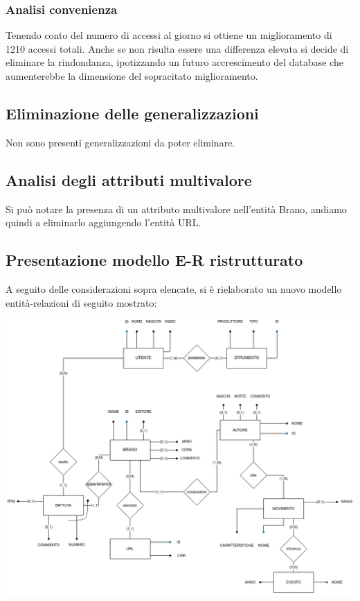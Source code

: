 \documentclass{article}
\begin{document}
    \subsubsection{Analisi convenienza}

    Tenendo conto del numero di accessi al giorno si ottiene un miglioramento di 1210 accessi totali. Anche se non risulta essere una differenza elevata si decide di eliminare la rindondanza, ipotizzando un futuro accrescimento del database che
    aumenterebbe la dimensione del sopracitato miglioramento.\\

    \subsection{Eliminazione delle generalizzazioni}

    Non sono presenti generalizzazioni da poter eliminare.\\

    \subsection{Analisi degli attributi multivalore}

    Si può notare la presenza di un attributo multivalore nell'entità Brano, andiamo quindi a eliminarlo aggiungendo l'entità URL.

    \subsection{Presentazione modello E-R ristrutturato}

    A seguito delle considerazioni sopra elencate, si è rielaborato un nuovo modello entità-relazioni di seguito mostrato:

    \begin{center}
        \includegraphics[width=\linewidth]{immagini/02_diagrammaER.png}
    \end{center}
\end{document}
